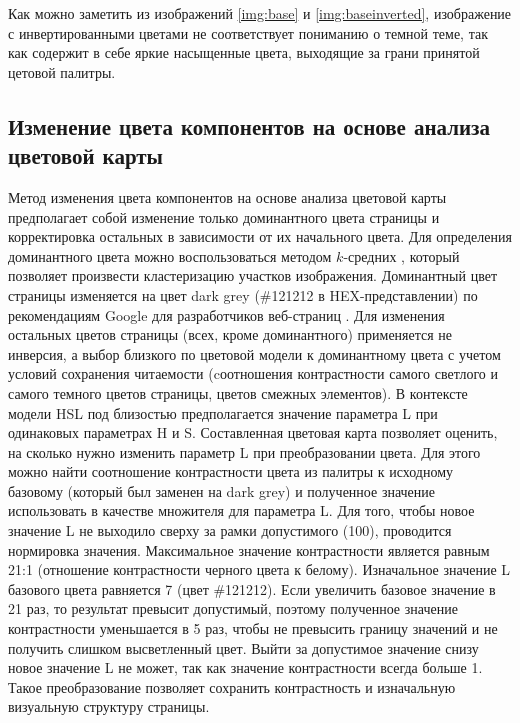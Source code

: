 \clearpage


\clearpage


Как можно заметить из изображений \ref{img:base} и \ref{img:baseinverted}, изображение с инвертированными цветами не соответствует пониманию о темной теме, так как содержит в себе яркие насыщенные цвета, выходящие за грани принятой цетовой палитры.

\clearpage

\subsection{Изменение цвета компонентов на основе анализа цветовой карты}

Метод изменения цвета компонентов на основе анализа цветовой карты  предполагает собой изменение только доминантного цвета страницы и корректировка остальных в зависимости от их начального цвета. Для определения доминантного цвета можно воспользоваться методом $k$-средних \cite{kmeans}, который позволяет произвести кластеризацию участков изображения. Доминантный цвет страницы изменяется на цвет dark grey (\#121212 в HEX-представлении) по рекомендациям Google для разработчиков веб-страниц \cite{material}. Для изменения остальных цветов страницы (всех, кроме доминантного) применяется не инверсия, а выбор близкого по цветовой модели к доминантному цвета с учетом условий сохранения читаемости \cite{wcag} (cоотношения контрастности самого светлого и самого темного цветов страницы, цветов смежных элементов). В контексте модели HSL под близостью предполагается значение параметра L при одинаковых параметрах H и S. Составленная цветовая карта позволяет оценить, на сколько нужно изменить параметр L при преобразовании цвета. Для этого можно найти соотношение контрастности цвета из палитры к исходному базовому (который был заменен на dark grey) и полученное значение использовать в качестве множителя для параметра L. Для того, чтобы новое значение L не выходило сверху за рамки допустимого (100), проводится нормировка значения. Максимальное значение контрастности является равным 21:1 (отношение контрастности черного цвета к белому). Изначальное значение L базового цвета равняется 7 (цвет \#121212). Если увеличить базовое значение в 21 раз, то результат превысит допустимый, поэтому полученное значение контрастности уменьшается в 5 раз, чтобы не превысить границу значений и не получить слишком высветленный цвет. Выйти за допустимое значение снизу новое значение L не может, так как значение контрастности всегда больше 1. Такое преобразование позволяет сохранить контрастность и  изначальную визуальную структуру страницы.
 
